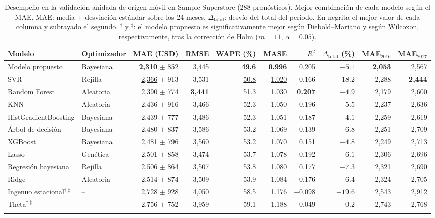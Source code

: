 \documentclass[pdflatex,sn-mathphys-num]{sn-jnl}
\theoremstyle{thmstyleone}
\begin{document}
\begin{table}[!htb]
\caption{Desempeño en la validación anidada de origen móvil en Sample Superstore (288 pronósticos). Mejor combinación de cada modelo según el MAE. MAE: media $\pm$ desviación estándar sobre los 24 meses. $\Delta_{\mathrm{total}}$: desvío del total del periodo. En negrita el mejor valor de cada columna y subrayado el segundo. $^{\dagger}$ y $^{\ddagger}$: el modelo propuesto es significativamente mejor según Diebold--Mariano y según Wilcoxon, respectivamente, tras la corrección de Holm ($m=11$, $\alpha=0.05$).}\label{tab:resultados}
\scriptsize
\begin{tabular*}{\textwidth}{@{\extracolsep\fill}llrrrrrrrr}
\toprule
Modelo & Optimizador & MAE (USD) & RMSE & WAPE (\%) & MASE & $R^2$ & $\Delta_{\mathrm{total}}$ (\%) & MAE$_{2016}$ & MAE$_{2017}$ \\
\midrule
Modelo propuesto & Bayesiana & \textbf{2{,}310} $\pm$ 852 & \underline{3{,}445} & \textbf{49.6} & \textbf{0.996} & \underline{0.205} & $-5.1$ & \textbf{2{,}053} & \underline{2{,}567} \\
SVR & Rejilla & \underline{2{,}366} $\pm$ 913 & 3{,}531 & \underline{50.8} & \underline{1.020} & 0.166 & $-18.2$ & 2{,}288 & \textbf{2{,}444} \\
Random Forest & Aleatoria & 2{,}390 $\pm$ 774 & \textbf{3{,}441} & 51.3 & 1.030 & \textbf{0.207} & $-4.9$ & \underline{2{,}179} & 2{,}600 \\
KNN & Aleatoria & 2{,}436 $\pm$ 916 & 3{,}466 & 52.3 & 1.050 & 0.196 & $-5.5$ & 2{,}237 & 2{,}636 \\
HistGradientBoosting & Bayesiana & 2{,}439 $\pm$ 777 & 3{,}486 & 52.3 & 1.051 & 0.187 & \underline{$-4.1$} & 2{,}259 & 2{,}619 \\
Árbol de decisión & Bayesiana & 2{,}480 $\pm$ 837 & 3{,}586 & 53.2 & 1.069 & 0.139 & $-6.8$ & 2{,}251 & 2{,}709 \\
XGBoost & Bayesiana & 2{,}481 $\pm$ 796 & 3{,}560 & 53.2 & 1.070 & 0.151 & $-4.8$ & 2{,}249 & 2{,}713 \\
Lasso & Genética & 2{,}501 $\pm$ 858 & 3{,}474 & 53.7 & 1.078 & 0.192 & $-6.1$ & 2{,}306 & 2{,}696 \\
Regresión bayesiana & Rejilla & 2{,}506 $\pm$ 864 & 3{,}507 & 53.8 & 1.080 & 0.177 & $-7.3$ & 2{,}321 & 2{,}690 \\
Ridge & Aleatoria & 2{,}514 $\pm$ 874 & 3{,}509 & 53.9 & 1.084 & 0.176 & $-6.4$ & 2{,}324 & 2{,}705 \\
Ingenuo estacional$^{\dagger\ddagger}$ & -- & 2{,}728 $\pm$ 928 & 4{,}050 & 58.5 & 1.176 & $-0.098$ & $-19.6$ & 2{,}543 & 2{,}912 \\
Theta$^{\dagger\ddagger}$ & -- & 2{,}756 $\pm$ 752 & 3{,}959 & 59.1 & 1.188 & $-0.049$ & $\mathbf{-0.2}$ & 2{,}743 & 2{,}768 \\
\botrule
\end{tabular*}
\end{table}
\end{document}
